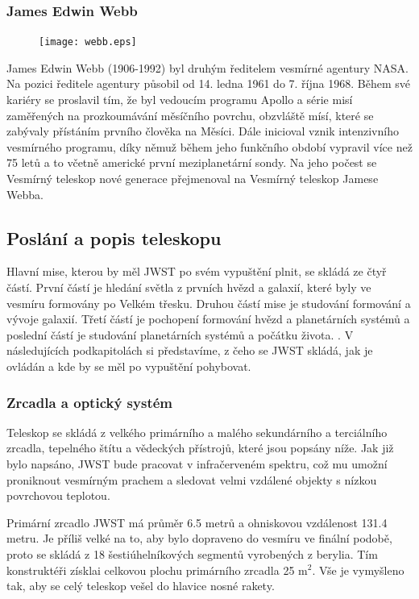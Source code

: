 \documentclass[a4paper,11pt]{article}
\begin{document}
\subsubsection{James Edwin Webb}
\begin{figure}
\texttt{[image: webb.eps]}
\end{figure}
James Edwin Webb (1906-1992) byl druhým ředitelem vesmírné agentury NASA. Na pozici ředitele agentury působil od 14. ledna 1961 do 7. října 1968. Během své kariéry se proslavil tím, že byl vedoucím programu Apollo a série misí zaměřených na prozkoumávání měsíčního povrchu, obzvláště mísí, které se zabývaly přístáním prvního člověka na Měsíci. 
Dále inicioval vznik intenzivního vesmírného programu, díky němuž během jeho funkčního období vypravil více než 75 letů a to včetně americké první meziplanetární sondy. Na jeho počest se Vesmírný teleskop nové generace přejmenoval na Vesmírný teleskop Jamese Webba.
\\

\subsection{Poslání a popis teleskopu}
Hlavní mise, kterou by měl JWST po svém vypuštění plnit, se skládá ze čtyř částí.  První částí je hledání světla z prvních hvězd a galaxií, které byly ve vesmíru formovány po Velkém třesku. Druhou částí mise je studování formování a vývoje galaxií. Třetí částí je pochopení formování hvězd a planetárních systémů a poslední částí je studování planetárních systémů a počátku života. \cite{wikipediaWebbEn}. V následujících podkapitolách si představíme, z čeho se JWST skládá, jak je ovládán a kde by se měl po vypuštění pohybovat.

\subsubsection{Zrcadla a optický systém}
Teleskop se skládá z velkého primárního a malého sekundárního a terciálního zrcadla, tepelného štítu a vědeckých přístrojů, které jsou popsány níže. Jak již bylo napsáno, JWST bude pracovat v infračerveném spektru, což mu umožní proniknout vesmírným prachem a sledovat velmi vzdálené objekty s nízkou povrchovou teplotou.

Primární zrcadlo JWST má průměr 6.5 metrů a ohniskovou vzdálenost 131.4 metru. Je příliš velké na to, aby bylo dopraveno do vesmíru ve finální podobě, proto se skládá z 18 šestiúhelníkových segmentů vyrobených z berylia. Tím konstruktéři získlai celkovou plochu primárního zrcadla 25 m$^2$. Vše je vymyšleno tak, aby se celý teleskop vešel do hlavice nosné rakety.
\end{document}
